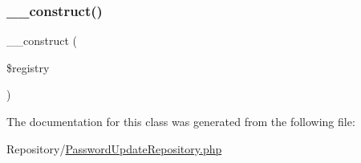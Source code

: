 \subsubsection{\texorpdfstring{\_\_construct()}{\_\_construct()}}
{\footnotesize\ttfamily \+\_\+\+\_\+construct (\begin{DoxyParamCaption}\item[{Registry\+Interface}]{\$registry }\end{DoxyParamCaption})}



The documentation for this class was generated from the following file\+:\begin{DoxyCompactItemize}
\item 
Repository/\mbox{\hyperlink{_password_update_repository_8php}{Password\+Update\+Repository.\+php}}\end{DoxyCompactItemize}
